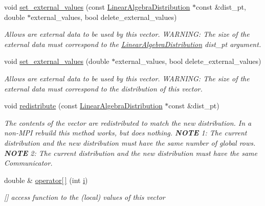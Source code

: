 \begin{DoxyCompactItemize}
\item 
void \hyperlink{classoomph_1_1DoubleVector_a4715c8cf47f9fc56d95889343d1a3b82}{set\+\_\+external\+\_\+values} (const \hyperlink{classoomph_1_1LinearAlgebraDistribution}{Linear\+Algebra\+Distribution} $\ast$const \&dist\+\_\+pt, double $\ast$external\+\_\+values, bool delete\+\_\+external\+\_\+values)
\begin{DoxyCompactList}\small\item\em Allows are external data to be used by this vector. W\+A\+R\+N\+I\+NG\+: The size of the external data must correspond to the \hyperlink{classoomph_1_1LinearAlgebraDistribution}{Linear\+Algebra\+Distribution} dist\+\_\+pt argument. \end{DoxyCompactList}\item 
void \hyperlink{classoomph_1_1DoubleVector_a0626a448c259a12bd2b7d50f92da91e3}{set\+\_\+external\+\_\+values} (double $\ast$external\+\_\+values, bool delete\+\_\+external\+\_\+values)
\begin{DoxyCompactList}\small\item\em Allows are external data to be used by this vector. W\+A\+R\+N\+I\+NG\+: The size of the external data must correspond to the distribution of this vector. \end{DoxyCompactList}\item 
void \hyperlink{classoomph_1_1DoubleVector_a9396b861977c16606d8eca39056976c8}{redistribute} (const \hyperlink{classoomph_1_1LinearAlgebraDistribution}{Linear\+Algebra\+Distribution} $\ast$const \&dist\+\_\+pt)
\begin{DoxyCompactList}\small\item\em The contents of the vector are redistributed to match the new distribution. In a non-\/\+M\+PI rebuild this method works, but does nothing. {\bfseries N\+O\+TE} 1\+: The current distribution and the new distribution must have the same number of global rows. {\bfseries N\+O\+TE} 2\+: The current distribution and the new distribution must have the same Communicator. \end{DoxyCompactList}\item 
double \& \hyperlink{classoomph_1_1DoubleVector_acea3779324129da50076341bf6644d25}{operator\mbox{[}$\,$\mbox{]}} (int \hyperlink{cfortran_8h_adb50e893b86b3e55e751a42eab3cba82}{i})
\begin{DoxyCompactList}\small\item\em \mbox{[}\mbox{]} access function to the (local) values of this vector \end{DoxyCompactList}\item 

\end{DoxyCompactItemize}
